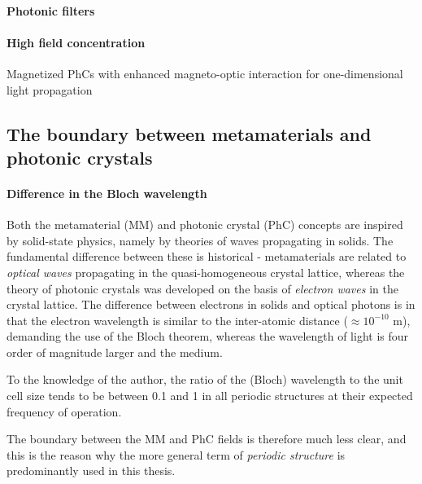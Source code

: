 \paragraph{Photonic filters}%

\paragraph{High field concentration}
Magnetized PhCs with enhanced magneto-optic interaction for one-dimensional light propagation


\subsection{The boundary between metamaterials and photonic crystals} 
\paragraph{Difference in the Bloch wavelength}%
Both the metamaterial (MM) and photonic crystal (PhC) concepts are inspired by solid-state physics, namely by theories of waves propagating in solids. The fundamental difference between these is historical - metamaterials are related to \textit{optical waves} propagating in the quasi-homogeneous crystal lattice, whereas the theory of photonic crystals was developed on the basis of \textit{electron waves} in the crystal lattice. The difference between electrons in solids and optical photons is in that the electron wavelength is similar to the inter-atomic distance ($\approx 10^{-10}$ m), demanding the use of the Bloch theorem, whereas the wavelength of light is four order of magnitude larger and the medium.

To the knowledge of the author, the ratio of the (Bloch) wavelength to the unit cell size tends to be between 0.1 and 1 in all periodic structures at their expected frequency of operation.

The boundary between the MM and PhC fields is therefore much less clear, and this is the reason why the more general term of \textit{periodic structure} is predominantly used in this thesis. 

